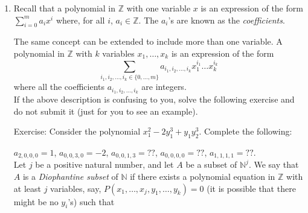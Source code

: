 \documentclass[11pt]{article}
\begin{document}
\begin{enumerate}[{\bf Q1.}]
    Let $M$ denote the Turing machine in Question 1 above.
    
    Consider the following Turing machine:

    $$M$$
    $$\tilde{M}_A$$
    $$q_{23} \; 1 \; q_{24} \; b \; L$$
    $$q_{23} \; b \; q_{25} \; b \; L$$
    $$q_{25} \; b \; q_{25} \; b \; L$$
    $$q_{25} \; 1 \; q_{26} \; b \; L$$
    $$q_{26} \; 1 \; q_{26} \; b \; L$$
    $$q_{24} \; b \; q_{24} \; b \; L$$
    $$q_{24} \; 1 \; q_{27} \; 1 \; L$$
    $$q_{27} \; 1 \; q_{27} \; 1 \; L$$
    $$q_{27} \; b \; q_{28} \; b \; R$$
    $$\tilde{M}_B$$
    
    where $\tilde{M}_A$ is the machine we obtain from $M_A$  by replacing every $q_i$ with $q_{i+7}$, and  $\tilde{M}_B$ is the machine we obtain from $M_B$  by replacing every $q_i$ with $q_{i+28}$. 

    This Turing machine computes the characteristic function of some set, find that set.  
    

    
\newpage
    

     \item Recall that a polynomial in $\mathbb{Z}$ with one variable $x$ is an expression of the form $\sum_{i=0}^m a_ix^i$ where, for all $i$, $a_i\in\mathbb{Z}$. The $a_i$'s are known as the \emph{coefficients}.

        The same concept can be extended to include more than one variable. A polynomial in   $\mathbb{Z}$ with $k$ variables $x_1,\ldots, x_k$ is an expression of the form $$\sum_{i_1, i_2, \ldots, i_k\in\{0,\ldots, m\}}a_{i_1,i_2,\ldots, i_k} x_1^{i_1}\ldots x_k^{i_k}$$ where all the coefficients  $a_{i_1,i_2,\ldots, i_k}$ are integers. \\

        If the above description is confusing to you, solve the following exercise and do not submit it (just for you to see an example).
        
        Exercise: Consider the polynomial $x_1^2 - 2 y_1^3 + y_1 y_2^3$. Complete the following:
        
        $a_{2,0,0,0} = 1$, $a_{0,0,3,0}=-2$, $a_{0,0,1,3} = ??$, $a_{0,0,0,0} = ??$, $a_{1,1,1,1} = ??$.\\




        Let $j$ be a positive natural number, and let $A$ be a subset of $\mathbb{N}^j$. We say that $A$ is a \emph{Diophantine subset} of $\mathbb{N}$ if there exists a polynomial equation in $\mathbb{Z}$ with at least $j$ variables, say, $P(x_1,\ldots, x_j, y_1,\ldots, y_k) = 0 $ (it is possible that there might be no $y_i$'s) such that
        

\end{enumerate}
\end{document}
